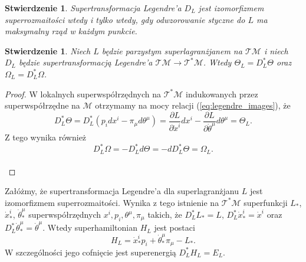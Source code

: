 \documentclass[11pt,a4paper]{report}
\newtheorem{proposition}[theorem]{Stwierdzenie}
\theoremstyle{definition}
\begin{document}
\begin{proposition}
 Supertransformacja Legendre'a $D_L$ jest izomorfizmem superrozmaitości wtedy i tylko wtedy, gdy odwzorowanie styczne do $L$ ma maksymalny rząd w każdym punkcie.
\end{proposition}

\begin{proposition}
 Niech $L$ będzie parzystym superlagranżjanem na $\mathcal{TM}$ i niech $D_L$ będzie supertransformacją Legendre'a $\mathcal{TM} \rightarrow \mathcal{T^*M}$. Wtedy $\Theta_L = D^*_L \Theta$ oraz $\Omega_L = D^*_L \Omega$.
\end{proposition}

\begin{proof}
 W lokalnych superwspółrzędnych na $\mathcal{T^*M}$ indukowanych przez superwspółrzędne na $\mathcal{M}$ otrzymamy na mocy relacji (\ref{eq:legendre_images}), że
 \begin{equation*}
 D^*_L \Theta = D^*_L (p_i dx^i - \pi_\mu d\theta^\mu) = \frac{\partial L}{\partial \dot x^i} dx^i - \frac{\partial L}{\partial \dot \theta^\mu} d\theta^\mu = \Theta_L.
 \end{equation*}
 Z tego wynika również
 \begin{equation*}
 D^*_L \Omega = - D^*_L d \Theta = - d D^*_L \Theta = \Omega_L.
 \end{equation*}\\[-34.5pt]
\end{proof}

Załóżmy, że supertransformacja Legendre'a dla superlagranżjanu $L$ jest izomorfizmem superrozmaitości. Wynika z tego istnienie na $\mathcal{T^*M}$ superfunkcji $L_*$, $\dot x^i_*$, $\dot \theta^\mu_*$ superwspółrzędnych ${x}^i, {p}_i, {\theta}^\mu, {\pi}_\mu$ takich, że $D^*_L L_* = L$, $D^*_L \dot x^i_* = \dot x^i$ oraz $D^*_L \dot \theta^\mu_* = \dot \theta^\mu$. Wtedy superhamiltonian $H_L$ jest postaci
\begin{equation*}
 H_L = \dot x^i _* p_i + \dot \theta^\mu _* \pi_\mu - L_*.
\end{equation*}
W szczególności jego cofnięcie jest superenergią $D^*_L H_L = E_L$.
\end{document}
